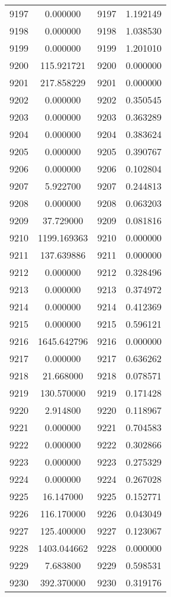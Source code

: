 \documentclass[12pt]{article}
\begin{document}
\begin{longtable}{@{}cccc@{}}
9197 & 0.000000 & 9197 & 1.192149 \\
9198 & 0.000000 & 9198 & 1.038530 \\
9199 & 0.000000 & 9199 & 1.201010 \\
9200 & 115.921721 & 9200 & 0.000000 \\
9201 & 217.858229 & 9201 & 0.000000 \\
9202 & 0.000000 & 9202 & 0.350545 \\
9203 & 0.000000 & 9203 & 0.363289 \\
9204 & 0.000000 & 9204 & 0.383624 \\
9205 & 0.000000 & 9205 & 0.390767 \\
9206 & 0.000000 & 9206 & 0.102804 \\
9207 & 5.922700 & 9207 & 0.244813 \\
9208 & 0.000000 & 9208 & 0.063203 \\
9209 & 37.729000 & 9209 & 0.081816 \\
9210 & 1199.169363 & 9210 & 0.000000 \\
9211 & 137.639886 & 9211 & 0.000000 \\
9212 & 0.000000 & 9212 & 0.328496 \\
9213 & 0.000000 & 9213 & 0.374972 \\
9214 & 0.000000 & 9214 & 0.412369 \\
9215 & 0.000000 & 9215 & 0.596121 \\
9216 & 1645.642796 & 9216 & 0.000000 \\
9217 & 0.000000 & 9217 & 0.636262 \\
9218 & 21.668000 & 9218 & 0.078571 \\
9219 & 130.570000 & 9219 & 0.171428 \\
9220 & 2.914800 & 9220 & 0.118967 \\
9221 & 0.000000 & 9221 & 0.704583 \\
9222 & 0.000000 & 9222 & 0.302866 \\
9223 & 0.000000 & 9223 & 0.275329 \\
9224 & 0.000000 & 9224 & 0.267028 \\
9225 & 16.147000 & 9225 & 0.152771 \\
9226 & 116.170000 & 9226 & 0.043049 \\
9227 & 125.400000 & 9227 & 0.123067 \\
9228 & 1403.044662 & 9228 & 0.000000 \\
9229 & 7.683800 & 9229 & 0.598531 \\
9230 & 392.370000 & 9230 & 0.319176 \\

\end{longtable}
\end{document}
